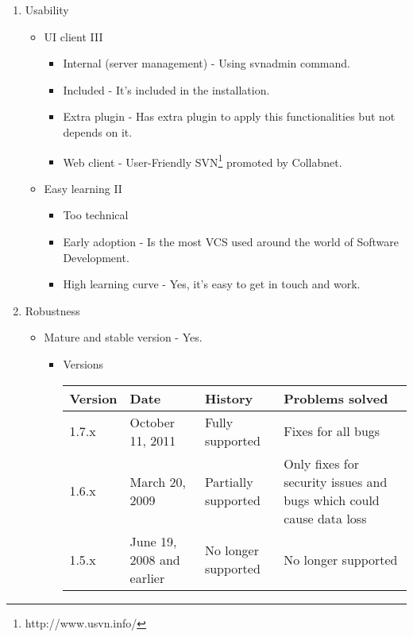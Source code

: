 \documentclass[11pt]{scrartcl}
\begin{document}
\begin{enumerate}
    \item Usability
        \begin{itemize}
	    \item UI client III
        	\begin{itemize}
                \item Internal (server management) - Using svnadmin command.
                \item Included - It's included in the installation.
                \item Extra plugin - Has extra plugin to apply this functionalities but not depends on it.
                \item Web client - User-Friendly SVN\footnote{http://www.usvn.info/} promoted by Collabnet.
            \end{itemize}

	    \item Easy learning II
        	\begin{itemize}
                \item Too technical 
                \item Early adoption - Is the most VCS used around the world of Software Development.
                \item High learning curve - Yes, it's easy to get in touch and work.
            \end{itemize}
        \end{itemize}

    \item Robustness

        \begin{itemize}
	    \item Mature and stable version - Yes.
	        \begin{itemize}
            \item Versions

                \begin{tabular}{|l|l|l|l|}
                    \hline
	                    {\bf Version} & {\bf Date} & {\bf History} & {\bf Problems solved}\\
                    \hline
	                    1.7.x & October 11, 2011 & Fully supported & Fixes for all bugs\\
                    \hline
	                    1.6.x & March 20, 2009 & Partially supported & Only fixes for security issues and bugs which could cause data loss\\
                    \hline
	                    1.5.x & June 19, 2008 and earlier & No longer supported & No longer supported\\
                    \hline
                \end{tabular}


\end{itemize}
\end{itemize}
\end{enumerate}
\end{document}
